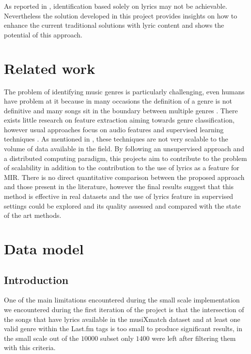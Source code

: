 \documentclass[10pt,a4paper, twocolumn]{article}
\begin{document}
	As reported in \cite{doi:10.1300/J116v02n03_01}, identification based
	solely on lyrics may not be achievable. Nevertheless the solution developed
	in this project provides insights on how to enhance the current traditional
	solutions with lyric content and shows the potential of this approach.

  \section{Related work}

	The problem of identifying music genres is particularly challenging, even
	humans have problem at it because in many occasions the definition of a genre
	is not definitive and many songs sit in the boundary between multiple genres
	\cite{Li:2003:CSC:860435.860487}. There exists little research on
	feature extraction aiming towards genre classification, however
	usual approaches focus on audio features and supervised learning
	techniques \cite{1021072}.
	As mentioned in \cite{mckay2006musical}, these techniques
	are not very scalable to the volume of data available in the field. By following
	an unsupervised approach and a distributed computing paradigm, this projects
	aim to contribute to the problem of scalability in addition to the contribution
	to the use of lyrics as a feature for MIR.
	There is no direct quantitative comparison between the proposed approach and those
	present in the literature, however the final results suggest that this method
	is effective in real datasets and the use of lyrics feature in supervised settings
	could be explored and its quality assessed and compared with the state of the
	art methods.

  \section{Data model}
    \subsection{Introduction}

    One of the main limitations encountered during the small scale implementation
    we encountered during the first iteration of the project is that the
    intersection of the songs that have lyrics available in the musiXmatch
    dataset and at least one valid genre within the Last.fm tags is too small to
    produce significant results, in the small scale out of the $10000$ subset only
    $1400$ were left after filtering them with this criteria.
    
\end{document}
